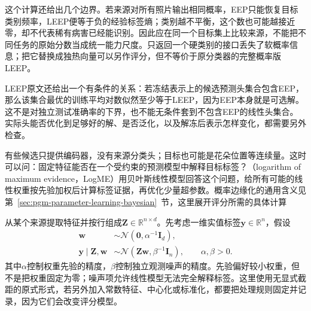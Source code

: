 这个计算还给出几个边界。若来源对所有照片输出相同概率，EEP只能恢复目标类别频率，LEEP便等于负的经验标签熵；类别越不平衡，这个数也可能越接近零，却不代表稀有病害已经能识别。因此应在同一个目标集上比较来源，不能把不同任务的原始分数当成统一能力尺度。只返回一个硬类别的接口丢失了软概率信息；把它替换成独热向量可以另作评分，但不等价于原分类器的完整概率版LEEP。

LEEP原文还给出一个有条件的关系：若冻结表示上的候选预测头集合包含EEP，那么该集合最优的训练平均对数似然至少等于LEEP，因为EEP本身就是可选解。这不是对独立测试准确率的下界，也不能无条件套到不包含EEP的线性头集合。实际头能否优化到足够好的解、是否泛化，以及解冻后表示怎样变化，都需要另外检查。

有些候选只提供编码器，没有来源分类头；目标也可能是花朵位置等连续量。这时可以问：固定特征能否在一个受约束的预测模型中解释目标标签？（logarithm of maximum evidence，LogME）用贝叶斯线性模型回答这个问题，给所有可能的线性权重按先验加权后计算标签证据，再优化少量超参数。概率边缘化的通用含义见第~\ref{sec:pgm-parameter-learning-bayesian}~节，这里展开评分所需的具体计算

从某个来源提取特征并按行组成$\bm Z\in\mathbb R^{n\times d}$。先考虑一维实值标签$\bm y\in\mathbb R^n$，假设
\begin{equation}
  \begin{aligned}
    \bm w&\sim\mathcal N(\bm0,\alpha^{-1}\bm I_d),\\
    \bm y\mid\bm Z,\bm w
    &\sim\mathcal N(\bm Z\bm w,\beta^{-1}\bm I_n),
    \qquad \alpha,\beta>0.
  \end{aligned}
  \label{eq:ket-reuse-logme-model}
\end{equation}
其中$\alpha$控制权重先验的精度，$\beta$控制独立观测噪声的精度。先验偏好较小权重，但不是把权重固定为零；噪声项允许线性模型无法完全解释标签。这里使用无显式截距的原式形式，若另外加入常数特征、中心化或标准化，都要把处理规则固定并记录，因为它们会改变评分模型。

